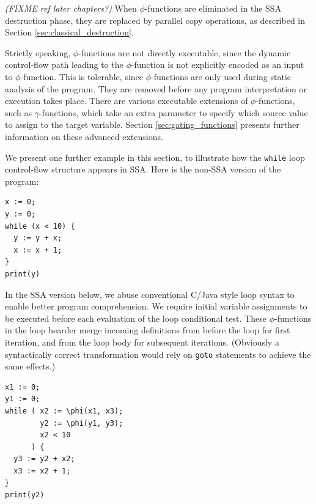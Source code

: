 \textit{(FIXME ref later chapters?)}
When $\phi$-functions are eliminated in the SSA destruction phase,
they are replaced by parallel copy operations,
as described in Section \ref{sec:classical_destruction}.

Strictly speaking, $\phi$-functions are not directly executable,
since the dynamic control-flow path leading to the $\phi$-function
is not explicitly encoded as an input to $\phi$-function.
This is tolerable, since $\phi$-functions are only 
used during static analysis of the program. They are removed
before any program interpretation or execution takes place.
There are various executable extensions of $\phi$-functions, 
such as $\gamma$-functions, which take
an extra parameter to specify which source value to assign to the
target variable. 
Section \ref{sec:gating_functions}
presents further information on these advanced
extensions.



We present one further example in this section,
to illustrate how the \texttt{while} loop
control-flow structure appears in SSA.
Here is the non-SSA version of the program:

\begin{verbatim}
x := 0;
y := 0;
while (x < 10) {
  y := y + x;
  x := x + 1;
}
print(y)
\end{verbatim}

In the SSA version below,
we abuse conventional C/Java style loop syntax to 
enable better program comprehension.
We require initial variable assignments to be
executed before each evaluation of the loop 
conditional test.
These $\phi$-functions in the loop hearder
merge incoming definitions from before the loop
for first iteration,
and from the loop body for subsequent iterations.
(Obviously 
a syntactically correct transformation would rely on
\texttt{goto} statements to achieve the same effects.)

\begin{verbatim}
x1 := 0;
y1 := 0;
while ( x2 := \phi(x1, x3);
        y2 := \phi(y1, y3); 
        x2 < 10
      ) {
  y3 := y2 + x2;
  x3 := x2 + 1;
}
print(y2)
\end{verbatim}

